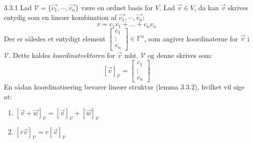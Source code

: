 \begin{definition}{3.3.1}
Lad $\mathcal{V} = \{\vec{v_1}, \cdots, \vec{v_n}\}$ være en ordnet basis 
	for $V$. Lad $\vec{v} \in V$, da kan $\vec{v}$ skrives entydig som en 
	lineær kombination af $\vec{v_1}, \cdots, \vec{v_n}$:
	\[
		v = c_1v_1 + \ldots + c_nv_n
	\]
	Der er således et entydigt element $\begin{bmatrix}c_1\\ \vdots \\ c_n
	\end{bmatrix} \in \mathbb{F}^n$, som angiver koordinaterne for $\vec{v}$ i
	$\mathcal{V}$. Dette kaldes \textit{koordinatvektoren} for $\vec{v}$ mht.
	$\mathcal{V}$ og denne skrives som:
	\[
		[\vec{v}]_\mathcal{V} = \begin{bmatrix}c_1\\ \vdots \\ c_n\end{bmatrix}
	\]
	En sådan koordinatisering bevarer lineær struktur (lemma 3.3.2), hvilket 
	vil sige at:
	\begin{enumerate}[(1)]
		\item $[\vec{v} + \vec{w}]_\mathcal{V} = [\vec{v}]_\mathcal{V} + [\vec{w}]_\mathcal{V}$
		\item $[r\vec{v}]_\mathcal{V} = r [\vec{v}]_\mathcal{V}$
	\end{enumerate}
\end{definition}
